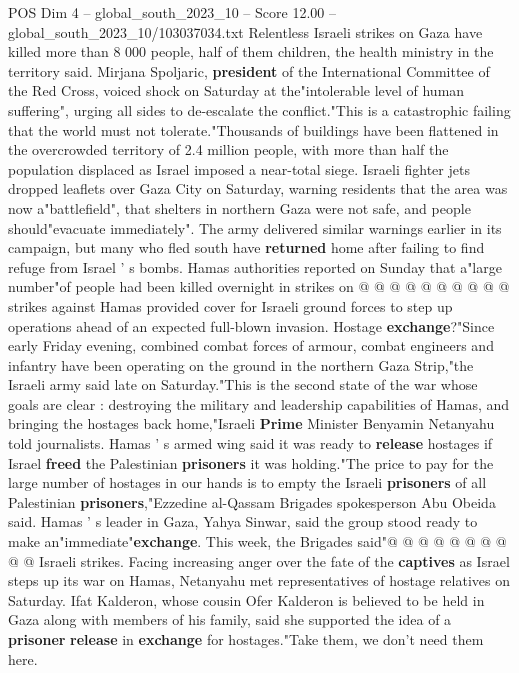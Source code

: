 \begin{textsample}{POS Dim 4 – global\_south\_2023\_10 – Score 12.00 – global\_south\_2023\_10/103037034.txt}  \label{ex:f4_pos_427}
Relentless Israeli strikes on Gaza have killed more than 8 000 people, half of them children, the health ministry in the territory said.
Mirjana Spoljaric, \textbf{president} of the International Committee of the Red Cross, voiced shock on Saturday at the"intolerable level of human suffering", urging all sides to de-escalate the conflict."This is a catastrophic failing that the world must not tolerate."Thousands of buildings have been flattened in the overcrowded territory of 2.4 million people, with more than half the population displaced as Israel imposed a near-total siege.
Israeli fighter jets dropped leaflets over Gaza City on Saturday, warning residents that the area was now a"battlefield", that shelters in northern Gaza were not safe, and people should"evacuate immediately".
The army delivered similar warnings earlier in its campaign, but many who fled south have \textbf{returned} home after failing to find refuge from Israel ' s bombs.
Hamas authorities reported on Sunday that a"large number"of people had been killed overnight in strikes on @ @ @ @ @ @ @ @ @ @ strikes against Hamas provided cover for Israeli ground forces to step up operations ahead of an expected full-blown invasion.
Hostage \textbf{exchange}?"Since early Friday evening, combined combat forces of armour, combat engineers and infantry have been operating on the ground in the northern Gaza Strip,"the Israeli army said late on Saturday."This is the second state of the war whose goals are clear : destroying the military and leadership capabilities of Hamas, and bringing the hostages back home,"Israeli \textbf{Prime} Minister Benyamin Netanyahu told journalists.
Hamas ' s armed wing said it was ready to \textbf{release} hostages if Israel \textbf{freed} the Palestinian \textbf{prisoners} it was holding."The price to pay for the large number of hostages in our hands is to empty the Israeli \textbf{prisoners} of all Palestinian \textbf{prisoners},"Ezzedine al-Qassam Brigades spokesperson Abu Obeida said.
Hamas ' s leader in Gaza, Yahya Sinwar, said the group stood ready to make an"immediate"\textbf{exchange}.
This week, the Brigades said"@ @ @ @ @ @ @ @ @ @ Israeli strikes.
Facing increasing anger over the fate of the \textbf{captives} as Israel steps up its war on Hamas, Netanyahu met representatives of hostage relatives on Saturday.
Ifat Kalderon, whose cousin Ofer Kalderon is believed to be held in Gaza along with members of his family, said she supported the idea of a \textbf{prisoner} \textbf{release} in \textbf{exchange} for hostages."Take them, we don't need them here.

\end{textsample}
